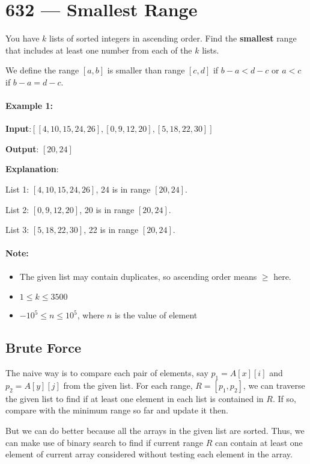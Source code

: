\section{632 --- Smallest Range}
You have $k$ lists of sorted integers in ascending order. Find the \textbf{smallest} range that includes at least one number from each of the $k$ lists.

We define the range $[a,b]$ is smaller than range $[c,d]$ if $b-a < d-c$ or $a < c$ if $b-a = d-c$.

\paragraph{Example 1:}

\begin{flushleft}
\textbf{Input}:$[[4,10,15,24,26], [0,9,12,20], [5,18,22,30]]$

\textbf{Output}: $[20,24]$

\textbf{Explanation}: 

List 1: $[4, 10, 15, 24,26]$, 24 is in range $[20,24]$.

List 2: $[0, 9, 12, 20]$, 20 is in range $[20,24]$.

List 3: $[5, 18, 22, 30]$, 22 is in range $[20,24]$.
\end{flushleft}

\paragraph{Note:}

\begin{itemize}
\item The given list may contain duplicates, so ascending order means $\geq$ here.
\item $ 1 \leq k \leq 3500$
\item $-10^5 \leq n \leq 10^5$, where $n$ is the value of element
\end{itemize}

\subsection{Brute Force}
The naive way is to compare each pair of elements, say $p_1 = A[x][i]$ and $ p_2 = A[y][j]$ from the given list. For each range, $R=[p_1, p_2]$, we can traverse the given list to find if at least one element in each list is contained in $R$. If so, compare with the minimum range so far and update it then.

But we can do better because all the arrays in the given list are sorted. Thus, we can make use of binary search to find if current range $R$ can contain at least one element of current array considered without testing each element in the array.

